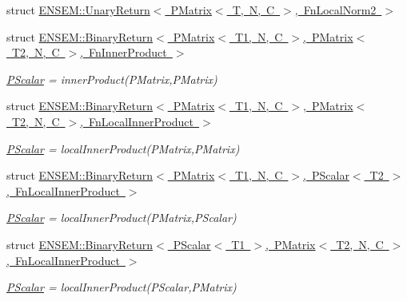 \begin{DoxyCompactItemize}
struct \mbox{\hyperlink{structENSEM_1_1UnaryReturn_3_01PMatrix_3_01T_00_01N_00_01C_01_4_00_01FnLocalNorm2_01_4}{E\+N\+S\+E\+M\+::\+Unary\+Return$<$ P\+Matrix$<$ T, N, C $>$, Fn\+Local\+Norm2 $>$}}
\item 
struct \mbox{\hyperlink{structENSEM_1_1BinaryReturn_3_01PMatrix_3_01T1_00_01N_00_01C_01_4_00_01PMatrix_3_01T2_00_01N_00_073dfb745dc2b12345e8e4de199894c8}{E\+N\+S\+E\+M\+::\+Binary\+Return$<$ P\+Matrix$<$ T1, N, C $>$, P\+Matrix$<$ T2, N, C $>$, Fn\+Inner\+Product $>$}}
\begin{DoxyCompactList}\small\item\em \mbox{\hyperlink{classENSEM_1_1PScalar}{P\+Scalar}} = inner\+Product(\+P\+Matrix,\+P\+Matrix) \end{DoxyCompactList}\item 
struct \mbox{\hyperlink{structENSEM_1_1BinaryReturn_3_01PMatrix_3_01T1_00_01N_00_01C_01_4_00_01PMatrix_3_01T2_00_01N_00_21d827057038aa42c2c8bc00c90c1d07}{E\+N\+S\+E\+M\+::\+Binary\+Return$<$ P\+Matrix$<$ T1, N, C $>$, P\+Matrix$<$ T2, N, C $>$, Fn\+Local\+Inner\+Product $>$}}
\begin{DoxyCompactList}\small\item\em \mbox{\hyperlink{classENSEM_1_1PScalar}{P\+Scalar}} = local\+Inner\+Product(\+P\+Matrix,\+P\+Matrix) \end{DoxyCompactList}\item 
struct \mbox{\hyperlink{structENSEM_1_1BinaryReturn_3_01PMatrix_3_01T1_00_01N_00_01C_01_4_00_01PScalar_3_01T2_01_4_00_01FnLocalInnerProduct_01_4}{E\+N\+S\+E\+M\+::\+Binary\+Return$<$ P\+Matrix$<$ T1, N, C $>$, P\+Scalar$<$ T2 $>$, Fn\+Local\+Inner\+Product $>$}}
\begin{DoxyCompactList}\small\item\em \mbox{\hyperlink{classENSEM_1_1PScalar}{P\+Scalar}} = local\+Inner\+Product(\+P\+Matrix,\+P\+Scalar) \end{DoxyCompactList}\item 
struct \mbox{\hyperlink{structENSEM_1_1BinaryReturn_3_01PScalar_3_01T1_01_4_00_01PMatrix_3_01T2_00_01N_00_01C_01_4_00_01FnLocalInnerProduct_01_4}{E\+N\+S\+E\+M\+::\+Binary\+Return$<$ P\+Scalar$<$ T1 $>$, P\+Matrix$<$ T2, N, C $>$, Fn\+Local\+Inner\+Product $>$}}
\begin{DoxyCompactList}\small\item\em \mbox{\hyperlink{classENSEM_1_1PScalar}{P\+Scalar}} = local\+Inner\+Product(\+P\+Scalar,\+P\+Matrix) \end{DoxyCompactList}\item 

\end{DoxyCompactItemize}
